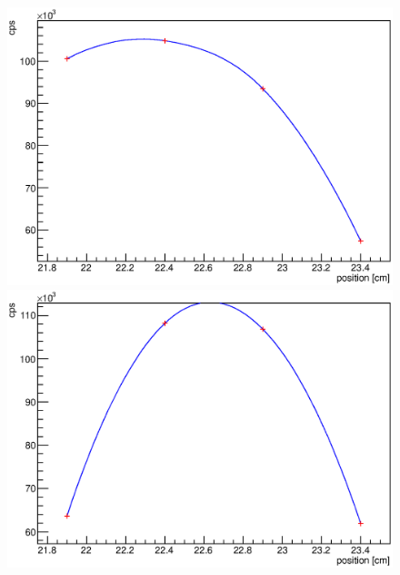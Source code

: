 \begin{figure}
\begin{minipage}[d]{0.24 \textwidth}
	\end{minipage}
	\begin{minipage}[d]{0.24 \textwidth}
		  \includegraphics[width=\textwidth]{graphics/cobalt/modules/2A.eps}
	\end{minipage}
	\begin{minipage}[d]{0.24 \textwidth}
		  \includegraphics[width=\textwidth]{graphics/cobalt/modules/2B.eps}
	\end{minipage}\newline
	

\end{figure}
